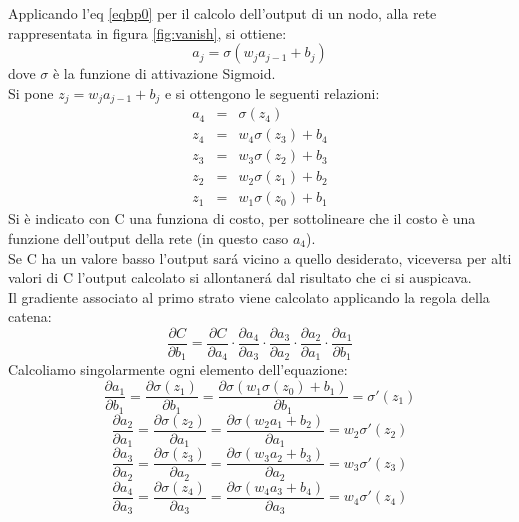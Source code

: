 \documentclass[a4paper,12pt,oneside]{book}
\begin{document}
Applicando l'eq \ref{eqbp0} per il calcolo dell'output di un nodo, alla rete rappresentata in figura \ref{fig:vanish}, si ottiene:
\begin{equation}
a_j=\sigma(w_j a_{j-1} +b_j)
\end{equation}
dove $\sigma$ \`e la funzione di attivazione Sigmoid.\\
Si pone $z_j=w_j a_{j-1} +b_j$ e si ottengono le seguenti relazioni:
\begin{eqnarray}
a_4&=&\sigma(z_4)\nonumber \\
z_4&=&w_4 \sigma(z_3)+b_4 \nonumber \\
z_3&=&w_3 \sigma(z_2)+b_3 \nonumber \\
z_2&=&w_2 \sigma(z_1)+b_2 \nonumber \\
z_1&=&w_1 \sigma(z_0)+b_1 \nonumber
\end{eqnarray}
Si \`e indicato con C una funziona di costo, per sottolineare che il costo \`e una funzione dell'output della rete (in questo caso $a_4$).\\
Se C ha un valore basso l'output sar\'{a} vicino a quello desiderato, viceversa per alti valori di C l'output calcolato si allontaner\'{a} dal risultato che ci si auspicava.\\
Il gradiente associato al primo strato viene calcolato applicando la regola della catena:
\begin{equation} \label{catena}
\frac{\partial C}{\partial b_1}=\frac{\partial C}{\partial a_4} \cdot \frac{\partial a_4}{\partial a_3} \cdot \frac{\partial a_3}{\partial a_2} \cdot \frac{\partial a_2}{\partial a_1} \cdot \frac{\partial a_1}{\partial b_1}
\end{equation}
Calcoliamo singolarmente ogni elemento dell'equazione:
\begin{equation}
\frac{\partial a_1}{\partial b_1} = \frac{\partial \sigma (z_1)}{\partial b_1} = \frac{\partial \sigma(w_1 \sigma(z_0)+b_1)}{\partial b_1} = \sigma '(z_1)
\end{equation}
\begin{equation}
\frac{\partial a_2}{\partial a_1}=\frac{\partial \sigma (z_2)}{\partial a_1} = \frac{\partial \sigma(w_2 a_1 +b_2)}{\partial a_1} = w_2 \sigma ' (z_2)
\end{equation}
\begin{equation}
 \frac{\partial a_3}{\partial a_2}=\frac{\partial \sigma (z_3)}{\partial a_2} = \frac{\partial \sigma(w_3 a_2 +b_3)}{\partial a_2} = w_3 \sigma ' (z_3)
\end{equation}
\begin{equation}
 \frac{\partial a_4}{\partial a_3}=\frac{\partial \sigma (z_4)}{\partial a_3} = \frac{\partial \sigma(w_4 a_3 +b_4)}{\partial a_3} = w_4 \sigma ' (z_4)
\end{equation}
\end{document}
